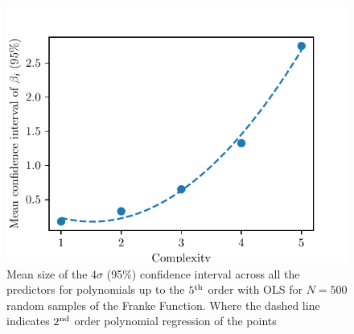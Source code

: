\documentclass[reprint, english, nofootinbib]{revtex4-2}
\begin{document}
\begin{figure}
    \centering
    \includegraphics[width=\columnwidth]{Franke_mean_confidence_interval.pdf}
    \caption{Mean size of the $4\sigma$ (95\%) confidence interval across all the predictors for polynomials up to the $5^{\textup{th}}$ order with OLS for $N=500$ random samples of the Franke Function. Where the dashed line indicates $2^\textup{nd}$ order polynomial regression of the points}
    \label{fig:mean confidence interval}
\end{figure}
\end{document}
